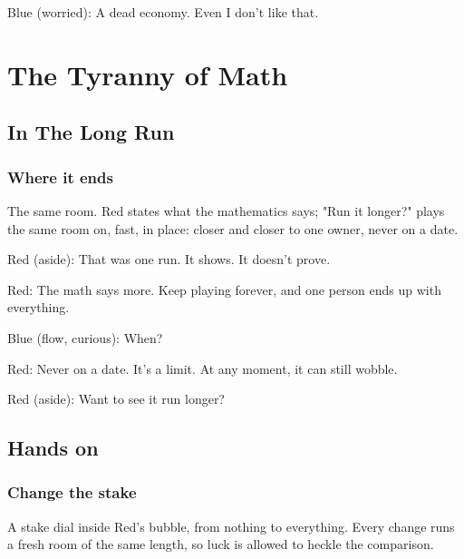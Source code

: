 Blue (worried): A dead economy.
Even I don't like that.


\chapter{The Tyranny of Math}\label{chapter:tyranny-of-math}

\section{In The Long Run}\label{index:the-inevitable}

\subsection{Where it ends}\label{act:end}

\label{end}

The same room. Red states what the mathematics says; "Run it longer?" plays
the same room on, fast, in place: closer and closer to one owner, never on a
date.


Red (aside): That was one run.
It shows. It doesn't prove.

Red: The math says more.
Keep playing forever, and one person ends up with everything.

Blue (flow, curious): When?

Red: Never on a date. It's a \gls{limit}.
At any moment, it can still wobble.

Red (aside): Want to see it run longer?

\section{Hands on}\label{index:hand-on-the-dial}

\subsection{Change the stake}\label{act:dial}

\label{dial}

A stake dial inside Red's bubble, from nothing to everything. Every change
runs a fresh room of the same length, so luck is allowed to heckle the
comparison.

